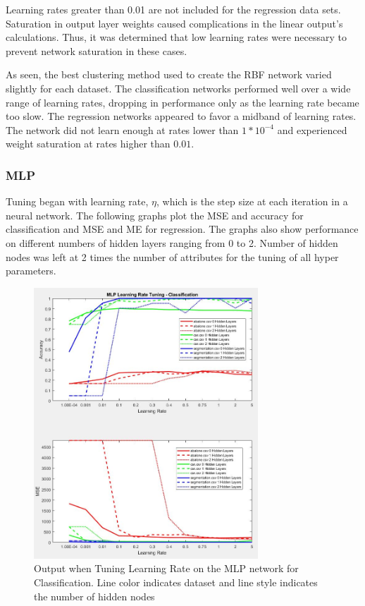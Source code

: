 \documentclass[twoside,11pt]{article}
\begin{document}
Learning rates greater than 0.01 are not included for the regression data sets. Saturation in output layer weights caused complications in the linear output's calculations. Thus, it was determined that low learning rates were necessary to prevent network saturation in these cases.

As seen, the best clustering method used to create the RBF network varied slightly for each dataset. The classification networks performed well over a wide range of learning rates, dropping in performance only as the learning rate became too slow. The regression networks appeared to favor a midband of learning rates. The network did not learn enough at rates lower than $1*10^{-4}$ and experienced weight saturation at rates higher than $0.01$.


\subsubsection{MLP}
Tuning began with learning rate, $\eta$, which is the step size at each iteration in a neural network. The following graphs plot the MSE and accuracy for classification and MSE and ME for regression. The graphs also show performance on different numbers of hidden layers ranging from 0 to 2. Number of hidden nodes was left at 2 times the number of attributes for the tuning of all hyper parameters.
\begin{figure}[h]
	\centering
	\includegraphics[height=4in]{FINAL_FIGS/MLP_LR_TUNING_CLASS.JPG}
	\caption{Output when Tuning Learning Rate on the MLP network for Classification. Line color indicates dataset and line style indicates the number of hidden nodes}
\end{figure}
\end{document}

